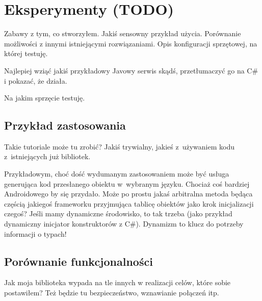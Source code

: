 \chapter{Eksperymenty (TODO)}
Zabawy z tym, co stworzyłem. Jakiś sensowny przykład użycia. Porównanie możliwości z innymi istniejącymi rozwiązaniami. Opis konfiguracji sprzętowej, na której testuję.

Najlepiej wziąć jakiś przykładowy Javowy serwis skądś, przetłumaczyć go na C\# i pokazać, że działa.

%


Na jakim sprzęcie testuję.

\section{Przykład zastosowania}
Takie tutoriale może tu zrobić? Jakiś trywialny, jakieś z~używaniem kodu z~istniejących już bibliotek.

Przykładowym, choć dość wydumanym zastosowaniem może być usługa generująca kod przesłanego obiektu w~wybranym języku. Chociaż coś bardziej Androidowego by się przydało.
Może po prostu jakaś arbitralna metoda będąca częścią jakiegoś frameworku przyjmująca tablicę obiektów jako krok inicjalizacji czegoś? Jeśli mamy dynamiczne środowisko, to tak trzeba (jako przykład dynamiczny inicjator konstruktorów z C\#). Dynamizm to klucz do potrzeby informacji o typach!

\section{Porównanie funkcjonalności}
Jak moja biblioteka wypada na tle innych w realizacji celów, które sobie postawiłem? Też będzie tu bezpieczeństwo, wznawianie połączeń itp.


